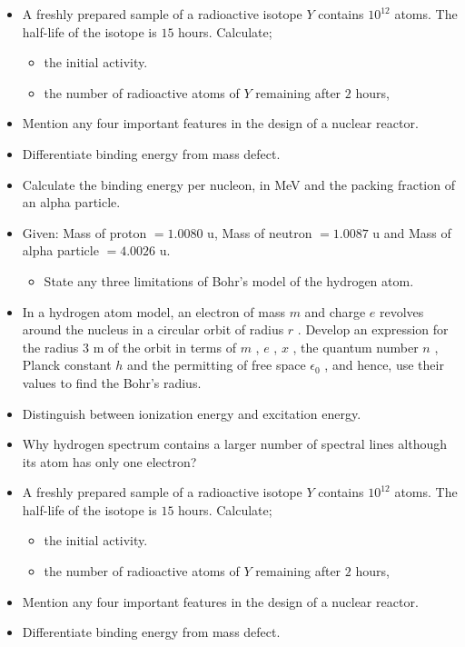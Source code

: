 \documentclass{article}
\begin{document}
\begin{itemize}
\begin{itemize}
\end{itemize}
\item A freshly prepared sample of a radioactive isotope $ Y$ contains $ 10^{12}$ atoms. The half-life of the isotope is $ 15$ hours. Calculate;
 \begin{itemize}
\item the initial activity. 
\item the number of radioactive atoms of $ Y$ remaining after $ 2$ hours, 
\end{itemize}
\item Mention any four important features in the design of a nuclear reactor.
\item Differentiate binding energy from mass defect.
\item Calculate the binding energy per nucleon, in MeV and the packing fraction of an alpha particle.
\item Given: Mass of proton $ =1.0080$ u, Mass of neutron $ =1.0087$ u and Mass of alpha particle $ =4.0026$ u.
 \begin{itemize}
\item State any three limitations of Bohr’s model of the hydrogen atom.
\end{itemize}
\item In a hydrogen atom model, an electron of mass $ m$ and charge $ e$ revolves around the nucleus in a circular orbit of radius $ r$ . Develop an expression for the radius $ 3$ m of the orbit in terms of $ m$ , $ e$ , $ x$ , the quantum number $ n$ , Planck constant $ h$ and the permitting of free space $ \epsilon _{0}$ , and hence, use their values to find the Bohr’s radius. 
\item Distinguish between ionization energy and excitation energy.
\item Why hydrogen spectrum contains a larger number of spectral lines although its  atom has only one electron? 
\item A freshly prepared sample of a radioactive isotope $ Y$ contains $ 10^{12}$ atoms. The half-life of the isotope is $ 15$ hours. Calculate;
 \begin{itemize}
\item the initial activity. 
\item the number of radioactive atoms of $ Y$ remaining after $ 2$ hours, 
\end{itemize}
\item Mention any four important features in the design of a nuclear reactor.
\item Differentiate binding energy from mass defect.

\end{itemize}
\end{document}
